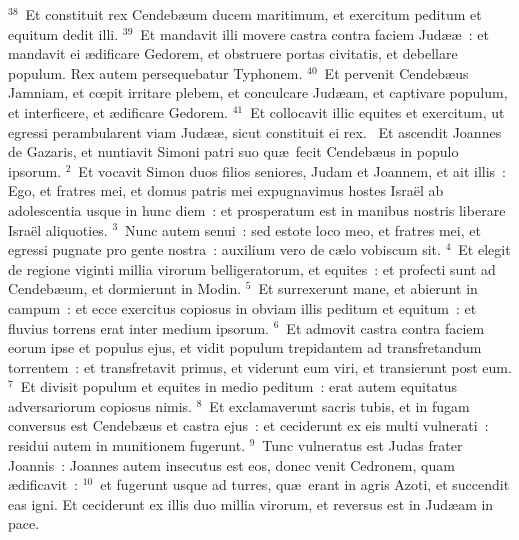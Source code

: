 ${}^{38}$~Et constituit rex Cendeb\ae um ducem maritimum, et exercitum peditum et equitum dedit illi.
${}^{39}$~Et mandavit illi movere castra contra faciem Jud\ae \ae~: et mandavit ei \ae dificare Gedorem, et obstruere portas civitatis, et debellare populum. Rex autem persequebatur Typhonem.
${}^{40}$~Et pervenit Cendeb\ae us Jamniam, et cœpit irritare plebem, et conculcare Jud\ae am, et captivare populum, et interficere, et \ae dificare Gedorem.
${}^{41}$~Et collocavit illic equites et exercitum, ut egressi perambularent viam Jud\ae \ae , sicut constituit ei rex.
~\lettrine[lines=10,image=true,loversize=0.05,lraise=-0.03]{E}{}t ascendit Joannes de Gazaris, et nuntiavit Simoni patri suo qu\ae\ fecit Cendeb\ae us in populo ipsorum.
${}^{2}$~Et vocavit Simon duos filios seniores, Judam et Joannem, et ait illis~: Ego, et fratres mei, et domus patris mei expugnavimus hostes Isra\"el ab adolescentia usque in hunc diem~: et prosperatum est in manibus nostris liberare Isra\"el aliquoties.
${}^{3}$~Nunc autem senui~: sed estote loco meo, et fratres mei, et egressi pugnate pro gente nostra~: auxilium vero de c\ae lo vobiscum sit.
${}^{4}$~Et elegit de regione viginti millia virorum belligeratorum, et equites~: et profecti sunt ad Cendeb\ae um, et dormierunt in Modin.
${}^{5}$~Et surrexerunt mane, et abierunt in campum~: et ecce exercitus copiosus in obviam illis peditum et equitum~: et fluvius torrens erat inter medium ipsorum.
${}^{6}$~Et admovit castra contra faciem eorum ipse et populus ejus, et vidit populum trepidantem ad transfretandum torrentem~: et transfretavit primus, et viderunt eum viri, et transierunt post eum.
${}^{7}$~Et divisit populum et equites in medio peditum~: erat autem equitatus adversariorum copiosus nimis.
${}^{8}$~Et exclamaverunt sacris tubis, et in fugam conversus est Cendeb\ae us et castra ejus~: et ceciderunt ex eis multi vulnerati~: residui autem in munitionem fugerunt.
${}^{9}$~Tunc vulneratus est Judas frater Joannis~: Joannes autem insecutus est eos, donec venit Cedronem, quam \ae dificavit~:
${}^{10}$~et fugerunt usque ad turres, qu\ae\ erant in agris Azoti, et succendit eas igni. Et ceciderunt ex illis duo millia virorum, et reversus est in Jud\ae am in pace.


